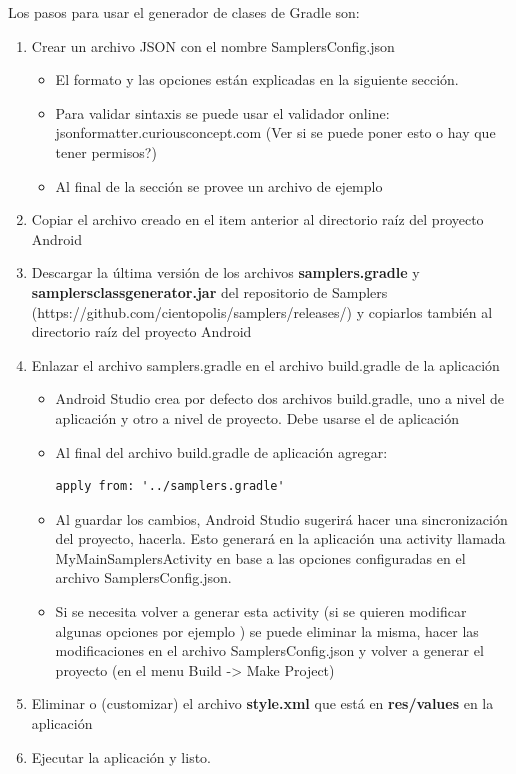 Los pasos para usar el generador de clases de Gradle son:
\begin{enumerate}
	\item Crear un archivo JSON con el nombre SamplersConfig.json
		\begin{itemize}
			\item El formato y las opciones están explicadas en la siguiente sección.
			\item Para validar sintaxis se puede usar el validador online: jsonformatter.curiousconcept.com (Ver si se puede poner esto o hay que tener permisos?)
			\item Al final de la sección se provee un archivo de ejemplo
		\end{itemize}
		
	\item Copiar el archivo creado en el item anterior al directorio raíz del proyecto Android
	
	\item Descargar la última versión de los archivos \textbf{samplers.gradle} y \textbf{samplersclassgenerator.jar} del repositorio de Samplers (https://github.com/cientopolis/samplers/releases/) y copiarlos también al directorio raíz del proyecto Android
	
	\item Enlazar el archivo samplers.gradle en el archivo build.gradle de la aplicación
		\begin{itemize}
			\item Android Studio crea por defecto dos archivos build.gradle, uno a nivel de aplicación y otro a nivel de proyecto. Debe usarse el de aplicación
			\item Al final del archivo build.gradle de aplicación agregar:
\begin{lstlisting}[language=XML, frame=tlb]
apply from: '../samplers.gradle'
\end{lstlisting}
			\item Al guardar los cambios, Android Studio sugerirá hacer una sincronización del proyecto, hacerla. Esto generará en la aplicación una activity llamada MyMainSamplersActivity en base a las opciones configuradas en el archivo SamplersConfig.json.
			\item Si se necesita volver a generar esta activity (si se quieren modificar algunas opciones por ejemplo ) se puede eliminar la misma, hacer las modificaciones en el archivo SamplersConfig.json y volver a generar el proyecto (en el menu Build -> Make Project)
		\end{itemize}
		
	\item Eliminar o (customizar) el archivo \textbf{style.xml} que está en \textbf{res/values} en la aplicación
	
	\item Ejecutar la aplicación y listo.

\end{enumerate}


